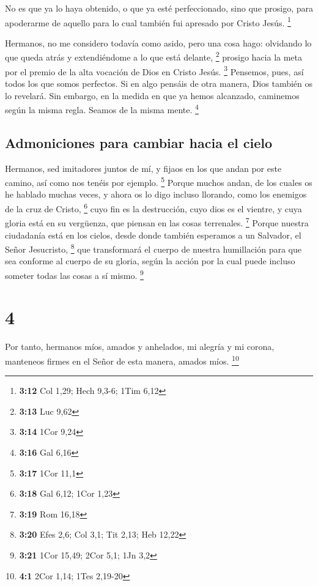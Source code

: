  No es que ya lo haya obtenido, o que ya esté
perfeccionado, sino que prosigo, para apoderarme de aquello para lo cual
también fui apresado por Cristo Jesús. \footnote{\textbf{3:12} Col 1,29;
  Hech 9,3-6; 1Tim 6,12}

 Hermanos, no me considero todavía como asido, pero una
cosa hago: olvidando lo que queda atrás y extendiéndome a lo que está
delante, \footnote{\textbf{3:13} Luc 9,62}  prosigo hacia
la meta por el premio de la alta vocación de Dios en Cristo Jesús.
\footnote{\textbf{3:14} 1Cor 9,24}  Pensemos, pues, así
todos los que somos perfectos. Si en algo pensáis de otra manera, Dios
también os lo revelará.  Sin embargo, en la medida en que
ya hemos alcanzado, caminemos según la misma regla. Seamos de la misma
mente. \footnote{\textbf{3:16} Gal 6,16}

\hypertarget{admoniciones-para-cambiar-hacia-el-cielo}{%
\subsection{Admoniciones para cambiar hacia el
cielo}\label{admoniciones-para-cambiar-hacia-el-cielo}}

 Hermanos, sed imitadores juntos de mí, y fijaos en los
que andan por este camino, así como nos tenéis por ejemplo. \footnote{\textbf{3:17}
  1Cor 11,1}  Porque muchos andan, de los cuales os he
hablado muchas veces, y ahora os lo digo incluso llorando, como los
enemigos de la cruz de Cristo, \footnote{\textbf{3:18} Gal 6,12; 1Cor
  1,23}  cuyo fin es la destrucción, cuyo dios es el
vientre, y cuya gloria está en su vergüenza, que piensan en las cosas
terrenales. \footnote{\textbf{3:19} Rom 16,18}  Porque
nuestra ciudadanía está en los cielos, desde donde también esperamos a
un Salvador, el Señor Jesucristo, \footnote{\textbf{3:20} Efes 2,6; Col
  3,1; Tit 2,13; Heb 12,22}  que transformará el cuerpo
de nuestra humillación para que sea conforme al cuerpo de su gloria,
según la acción por la cual puede incluso someter todas las cosas a sí
mismo. \footnote{\textbf{3:21} 1Cor 15,49; 2Cor 5,1; 1Jn 3,2}

\hypertarget{section-3}{%
\section{4}\label{section-3}}

 Por tanto, hermanos míos, amados y anhelados, mi alegría
y mi corona, manteneos firmes en el Señor de esta manera, amados míos.
\footnote{\textbf{4:1} 2Cor 1,14; 1Tes 2,19-20}

